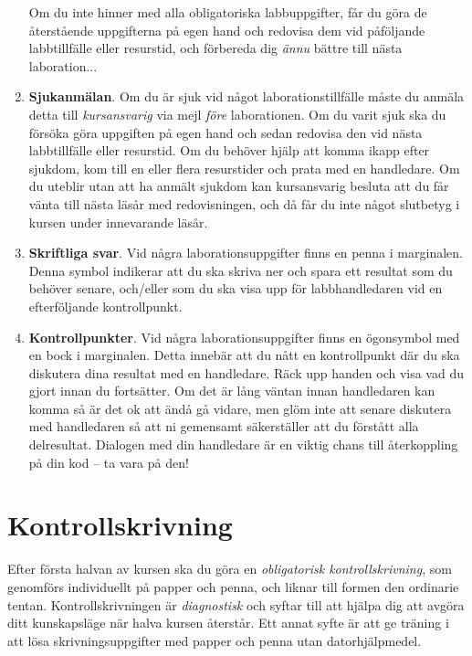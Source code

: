 \begin{enumerate}
Om du inte hinner med alla obligatoriska labbuppgifter, får du göra de återstående uppgifterna på egen hand och redovisa dem vid påföljande labbtillfälle eller resurstid, och förbereda dig \emph{ännu} bättre till nästa laboration...

\item \textbf{Sjukanmälan}. Om du är sjuk vid något laborationstillfälle måste du anmäla detta till \emph{kursansvarig} via mejl \emph{före} laborationen. Om du varit sjuk ska du försöka göra uppgiften på egen hand och sedan redovisa den vid nästa labbtillfälle eller resurstid. Om du behöver hjälp att komma ikapp efter sjukdom, kom till en eller flera resurstider och prata med en handledare. Om du uteblir utan att ha anmält sjukdom kan kursansvarig besluta att du får vänta till nästa läsår med redovisningen, och då får du inte något slutbetyg i kursen under innevarande läsår.

\item\Pen \textbf{Skriftliga svar}. Vid några laborationsuppgifter finns en penna i marginalen. Denna symbol indikerar att du ska skriva ner och spara ett resultat som du behöver senare, och/eller som du ska visa upp för labbhandledaren vid en efterföljande kontrollpunkt.

\item\Checkpoint \textbf{Kontrollpunkter}. Vid några laborationsuppgifter finns en ögonsymbol med en bock i marginalen. Detta innebär att du nått en kontrollpunkt där du ska diskutera dina resultat med en handledare. Räck upp handen och visa vad du gjort innan du fortsätter. Om det är lång väntan innan  handledaren kan komma så är det ok att ändå gå vidare, men glöm inte att senare diskutera med handledaren så att ni gemensamt säkerställer att du förstått alla delresultat. Dialogen med din handledare är en viktig chans till återkoppling på din kod -- ta vara på den!

\end{enumerate}

\section{Kontrollskrivning}\label{section:diagnostic-test}

Efter första halvan av kursen ska du göra en \emph{obligatorisk kontrollskrivning}, som genomförs individuellt på papper och penna, och liknar till formen den ordinarie tentan. Kontrollskrivningen är \emph{diagnostisk} och syftar till att hjälpa dig att avgöra ditt kunskapsläge när halva kursen återstår. Ett annat syfte är att ge träning i att lösa skrivningsuppgifter med papper och penna utan datorhjälpmedel.


